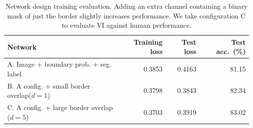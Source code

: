 \begin{table}[t]
\caption{Network design training evaluation. Adding an extra channel containing a binary mask of just the border slightly increases performance. We take configuration C to evaluate VI against human performance.}
\begin{tabular}{l rrr}
\toprule
Network & Training loss & \hspace{0.1cm}Test loss & \hspace{0.1cm}Test acc.~(\%) \\
\midrule
A. Image + boundary prob. + seg. label & 0.3853 & 0.4163 & 81.15 \\
B. A config. + small border overlap($d=1$) & 0.3798 & 0.3843 & 82.34\\
C. A config. + large border overlap ($d=5$) &  0.3703 & 0.3919 & 83.02\\
\bottomrule
\end{tabular}
\label{tab:spliterrorcorrectionperformance}
\vspace{-0.25cm}
\end{table}




